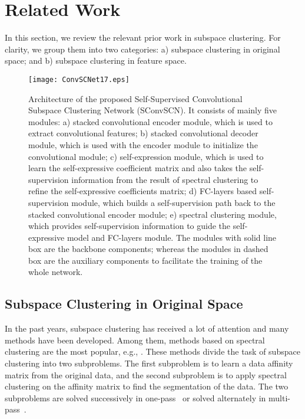 \documentclass[10pt,twocolumn,letterpaper]{article}
\def\eg{e.g.}
\def\eg{e.g.}
\begin{document}
\section{Related Work}
\label{sec:related-work}

In this section, we review the relevant prior work in subspace clustering. For clarity, we group them into two categories: a) subspace clustering in original space; and b) subspace clustering in feature space.


\begin{figure*}[t]
\vskip -5pt
\begin{center}
\centerline{\texttt{[image: ConvSCNet17.eps]}} \caption{Architecture of the proposed Self-Supervised Convolutional Subspace Clustering Network (SConvSCN). It consists of mainly five modules: a) stacked convolutional encoder module, which is used to extract convolutional features; b) stacked convolutional decoder module, which is used with the encoder module to initialize the convolutional module; c) self-expression module, which is used to learn the self-expressive coefficient matrix and also takes the self-supervision information from the result of spectral clustering to refine the self-expressive coefficients matrix; d) FC-layers based self-supervision module, which builds a self-supervision path back to the stacked convolutional encoder module; e) spectral clustering module, which provides self-supervision information to guide the self-expressive model and FC-layers module. The modules with solid line box are the backbone components; whereas the modules in dashed box are the auxiliary components to facilitate the training of the whole network.}
\label{fig:ConvSSCNet}
\end{center}
\vskip -25pt
\end{figure*}

\subsection{Subspace Clustering in Original Space}
In the past years, subspace clustering has received a lot of attention and many methods have been developed. Among them, methods based on spectral clustering are the most popular, \eg, \cite{Elham:CVPR09, Liu:ICML10, Favaro:CVPR11, Lu:ECCV12, Elham:TPAMI13, Liu:TPAMI13, Lu:ICCV13-TraceLasso, Feng:CVPR14, Li:CVPR15, Peng:TCYB16, You:CVPR16-EnSC, Zhang:VCIP16, Li:TIP17, You:ECCV18}. These methods divide the task of subspace clustering into two subproblems. The first subproblem is to learn a data affinity matrix from the original data, and the second subproblem is to apply spectral clustering on the affinity matrix to find the segmentation of the data. The two subproblems are solved successively in one-pass~\cite{Elham:CVPR09, Liu:ICML10, Favaro:CVPR11, Lu:ECCV12, Lu:ICCV13-TraceLasso, You:CVPR16-EnSC} or solved alternately in multi-pass~\cite{Feng:CVPR14, Li:CVPR15, Guo:IJCAI15, Zhang:VCIP16, Li:TIP17}. 
\end{document}
